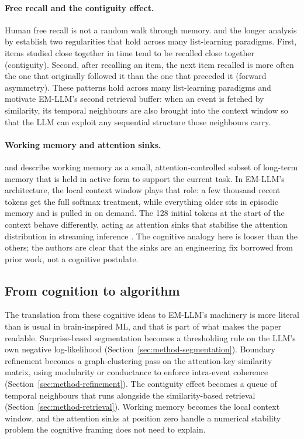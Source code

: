 \paragraph{Free recall and the contiguity effect.}
Human free recall is not a random walk through memory. \textcite{kahana1996contiguity} and the longer analysis by \textcite{howard2002contiguity} establish two regularities that hold across many list-learning paradigms. First, items studied close together in time tend to be recalled close together (contiguity). Second, after recalling an item, the next item recalled is more often the one that originally followed it than the one that preceded it (forward asymmetry). These patterns hold across many list-learning paradigms and motivate EM-LLM's second retrieval buffer: when an event is fetched by similarity, its temporal neighbours are also brought into the context window so that the LLM can exploit any sequential structure those neighbours carry.

\paragraph{Working memory and attention sinks.}
\textcite{baddeley1992working} and \textcite{cowan2001focus} describe working memory as a small, attention-controlled subset of long-term memory that is held in active form to support the current task. In EM-LLM's architecture, the local context window plays that role: a few thousand recent tokens get the full softmax treatment, while everything older sits in episodic memory and is pulled in on demand. The 128 initial tokens at the start of the context behave differently, acting as attention sinks that stabilise the attention distribution in streaming inference \cite{xiao2024attsinks}. The cognitive analogy here is looser than the others; the authors are clear that the sinks are an engineering fix borrowed from prior work, not a cognitive postulate.

\subsection{From cognition to algorithm}
\label{sec:cognition-to-algorithm}

The translation from these cognitive ideas to EM-LLM's machinery is more literal than is usual in brain-inspired ML, and that is part of what makes the paper readable. Surprise-based segmentation becomes a thresholding rule on the LLM's own negative log-likelihood (Section~\ref{sec:method-segmentation}). Boundary refinement becomes a graph-clustering pass on the attention-key similarity matrix, using modularity or conductance to enforce intra-event coherence (Section~\ref{sec:method-refinement}). The contiguity effect becomes a queue of temporal neighbours that runs alongside the similarity-based retrieval (Section~\ref{sec:method-retrieval}). Working memory becomes the local context window, and the attention sinks at position zero handle a numerical stability problem the cognitive framing does not need to explain.

